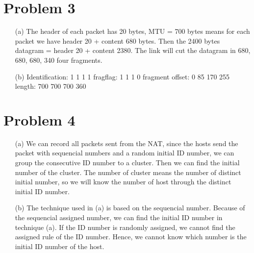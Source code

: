 \documentclass[12pt,a4paper]{article}
\begin{document}
\section*{Problem 3}    

\begin{enumerate}
    \item [(a)] 
        The header of each packet has 20 bytes, MTU = 700 bytes means for each packet we have header 20 + content 680 bytes.
        Then the 2400 bytes datagram = header 20 + content 2380.
        The link will cut the datagram in 680, 680, 680, 340 four fragments.

    \item[(b)]
        Identification: 1 1 1 1
        fragflag: 1 1 1 0
        fragment offset: 0 85 170 255
        length: 700 700 700 360

\end{enumerate}

\section*{Problem 4}

\begin{enumerate}
    \item [(a)] 
        We can record all packets sent from the NAT, since the hosts send the packet with sequencial numbers and a random initial ID number, we can group the consecutive ID number to a cluster.
        Then we can find the initial number of the cluster. The number of cluster means the number of distinct initial number, so we will know the number of host through the distinct initial ID number. 
    \item[(b)]
        The technique used in (a) is based on the sequencial number. Because of the sequencial assigned number, we can find the initial ID number in technique (a).
        If the ID number is randomly assigned, we cannot find the assigned rule of the ID number. Hence, we cannot know which number is the initial ID number of the host.
    
\end{enumerate}

\newpage
\end{document}
